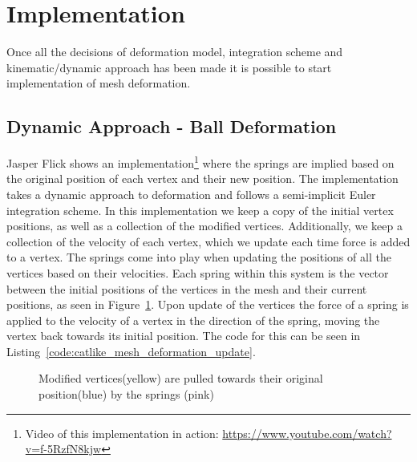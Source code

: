 \section{Implementation}
Once all the decisions of deformation model, integration scheme and kinematic/dynamic approach has been made it is possible to start implementation of mesh deformation.

\subsection{Dynamic Approach - Ball Deformation}
Jasper Flick\cite{catlike_mesh_deformation} shows an implementation\footnote{Video of this implementation in action: \url{https://www.youtube.com/watch?v=f-5RzfN8kjw}} where the springs are implied based on the original position of each vertex and their new position.
The implementation takes a dynamic approach to deformation and follows a semi-implicit Euler integration scheme.
In this implementation we keep a copy of the initial vertex positions, as well as a collection of the modified vertices.
Additionally, we keep a collection of the velocity of each vertex, which we update each time force is added to a vertex.
The springs come into play when updating the positions of all the vertices based on their velocities.
Each spring within this system is the vector between the initial positions of the vertices in the mesh and their current positions, as seen in Figure~\ref{fig:catlike_mesh_deformation_springs}.
Upon update of the vertices the force of a spring is applied to the velocity of a vertex in the direction of the spring, moving the vertex back towards its initial position.
The code for this can be seen in Listing~\ref{code:catlike_mesh_deformation_update}.

\begin{figure}
\centering
    \caption{Modified vertices(yellow) are pulled towards their original position(blue) by the springs (pink)\cite{catlike_mesh_deformation}}
    \label{fig:catlike_mesh_deformation_springs}
\end{figure}

